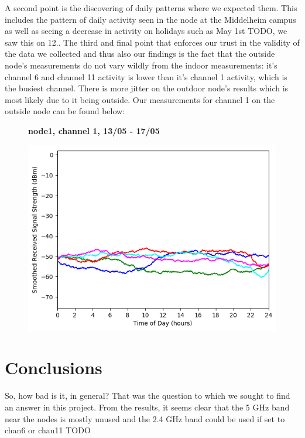 \documentclass[a4paper, 11pt]{article}
\begin{document}
A second point is the discovering of daily patterns where we expected them. This includes the pattern of daily activity seen in the node at the Middelheim campus as well as seeing a decrease in activity on holidays such as May 1st TODO, we saw this on 12.. 
The third and final point that enforces our trust in the validity of the data we collected and thus also our findings is the fact that the outside node's measurements do not vary wildly from the indoor measurements: it's channel 6 and channel 11 activity is lower than it's channel 1 activity, which is the busiest channel. There is more jitter on the outdoor node's results which is most likely due to it being outside. Our measurements for channel 1 on the outside node can be found below:\\ 
\begin{figure}[h!]
    \centering
    \textbf{node1, channel 1, 13/05 - 17/05}\par\medskip
	\includegraphics[scale=0.5]{images/2_4_GHz/node1_2017-05-17_chan1_image.png}
\end{figure} \newpage
\section{Conclusions}
So, how bad is it, in general? That was the question to which we sought to find an answer in this project. From the results, it seems clear that the 5 GHz band near the nodes is mostly unused and the 2.4 GHz band could be used if set to chan6 or chan11 TODO







\end{document}
